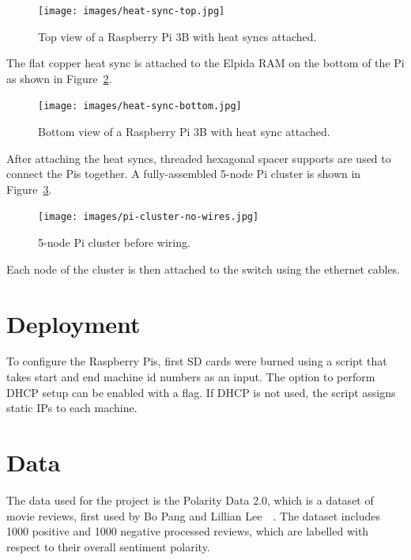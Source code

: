 \begin{figure}[!ht]
  \centering\texttt{[image: images/heat-sync-top.jpg]}
  \caption{Top view of a Raspberry Pi 3B with heat syncs attached.}\label{f:heat-sync-top}
\end{figure}

The flat copper heat sync is attached to the Elpida RAM on the bottom
of the Pi as shown in Figure~\ref{f:heat-sync-bottom}.

\begin{figure}[!ht]
  \centering\texttt{[image: images/heat-sync-bottom.jpg]}
  \caption{Bottom view of a Raspberry Pi 3B with heat sync attached.}\label{f:heat-sync-bottom}
\end{figure}

After attaching the heat syncs, threaded hexagonal spacer supports are used to connect the Pis together. A fully-assembled 5-node Pi cluster is shown in Figure~\ref{f:cluster-no-wires}.

\begin{figure}[!ht]
  \centering\texttt{[image: images/pi-cluster-no-wires.jpg]}
  \caption{5-node Pi cluster before wiring.}\label{f:cluster-no-wires}
\end{figure}

Each node of the cluster is then attached to the switch using the ethernet cables. 

\section{Deployment}
To configure the Raspberry Pis, first SD cards were burned using a
script that takes start and end machine id numbers as an input. The
option to perform DHCP setup can be enabled with a flag. If DHCP is
not used, the script assigns static IPs to each machine.

\section{Data}
\label{s:data}

The data used for the project is the Polarity Data 2.0, which is a dataset of 
movie reviews, first used by Bo Pang and Lillian 
Lee~\cite{hid-sp18-405-sentiment-pang2004asentimental}~\cite{hid-sp18-405-sentiment-pang2002thumbs}.
 The dataset includes 1000 positive and 1000 negative processed reviews, 
which are labelled with respect to their overall sentiment polarity. 

